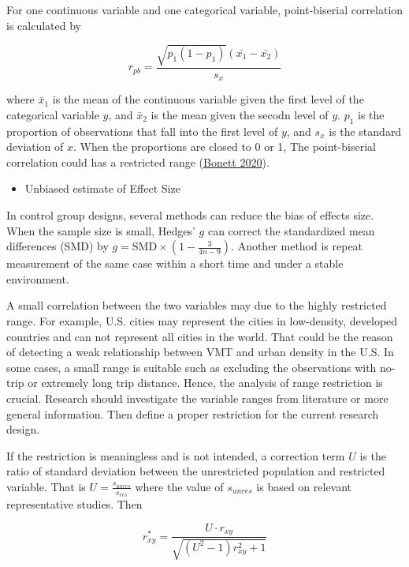 \documentclass[
  11pt,
  openany]{memoir}
\providecommand{\tightlist}{%
  \setlength{\itemsep}{0pt}\setlength{\parskip}{0pt}}
\begin{document}
For one continuous variable and one categorical variable, point-biserial correlation is calculated by

\begin{equation}
{r_{pb}}= \frac{\sqrt{p_1(1-p_1)}(\bar{x_1}-\bar{x_2})}{s_x}
\end{equation}

where \(\bar x_1\) is the mean of the continuous variable given the first level of the categorical variable \(y\), and \(\bar x_2\) is the mean given the secodn level of \(y\).
\(p_1\) is the proportion of observations that fall into the first level of \(y\), and
\(s_x\) is the standard deviation of \(x\).
When the proportions are closed to 0 or 1, The point-biserial correlation could has a restricted range (\protect\hyperlink{ref-bonettPointbiserialCorrelationInterval2020}{Bonett 2020}).

\begin{itemize}
\tightlist
\item
  Unbiased estimate of Effect Size
\end{itemize}

In control group designs, several methods can reduce the bias of effects size.
When the sample size is small, Hedges' \(g\) can correct the standardized mean differences (SMD) by \(g = \text{SMD} \times (1-\frac{3}{4n-9})\).
Another method is repeat measurement of the same case within a short time and under a stable environment.

A small correlation between the two variables may due to the highly restricted range.
For example, U.S. cities may represent the cities in low-density, developed countries and can not represent all cities in the world.
That could be the reason of detecting a weak relationship between VMT and urban density in the U.S.
In some cases, a small range is suitable such as excluding the observations with no-trip or extremely long trip distance.
Hence, the analysis of range restriction is crucial.
Research should investigate the variable ranges from literature or more general information.
Then define a proper restriction for the current research design.

If the restriction is meaningless and is not intended, a correction term \(U\) is the ratio of standard deviation between the unrestricted population and restricted variable.
That is \(U= \frac{s_{unres}}{s_{res}}\) where the value of \(s_{unres}\) is based on relevant representative studies. Then

\begin{equation}
r^*_{xy} = \frac{U\cdot r_{xy}}{\sqrt{(U^2-1)r_{xy}^2+1}} 
\end{equation}
\end{document}
